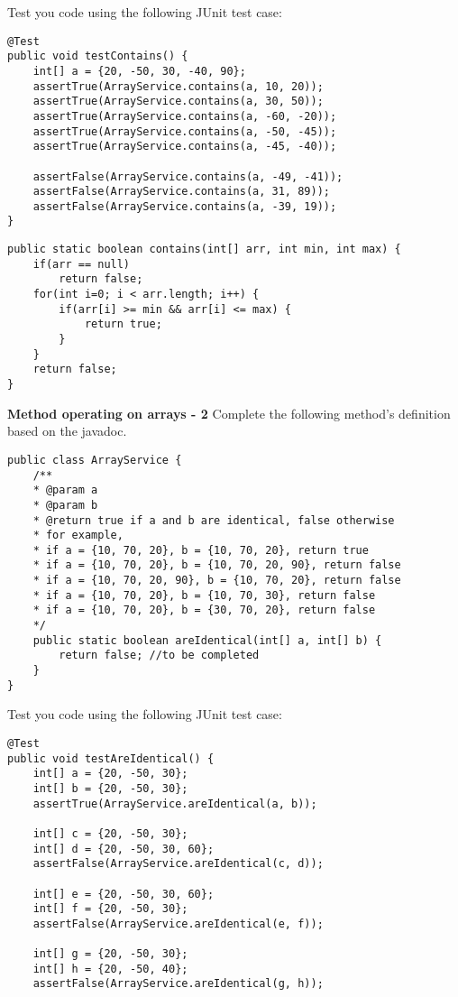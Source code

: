 \begin{questions}
Test you code using the following JUnit test case:

\begin{lstlisting}[style=junit]
@Test
public void testContains() {
	int[] a = {20, -50, 30, -40, 90};
	assertTrue(ArrayService.contains(a, 10, 20));
	assertTrue(ArrayService.contains(a, 30, 50));
	assertTrue(ArrayService.contains(a, -60, -20));
	assertTrue(ArrayService.contains(a, -50, -45));
	assertTrue(ArrayService.contains(a, -45, -40));
	
	assertFalse(ArrayService.contains(a, -49, -41));
	assertFalse(ArrayService.contains(a, 31, 89));
	assertFalse(ArrayService.contains(a, -39, 19));
}
\end{lstlisting}
\ifprintanswers
\begin{lstlisting}
public static boolean contains(int[] arr, int min, int max) {
	if(arr == null)
		return false;
	for(int i=0; i < arr.length; i++) {
		if(arr[i] >= min && arr[i] <= max) {
			return true;
		}
	}
	return false;
}
\end{lstlisting}
\else
\newpage
\fi

\question \textbf{Method operating on arrays - 2}
Complete the following method's definition based on the javadoc.

\begin{lstlisting}[style=junit]
public class ArrayService {
	/**
	* @param a
	* @param b
	* @return true if a and b are identical, false otherwise
	* for example,
	* if a = {10, 70, 20}, b = {10, 70, 20}, return true
	* if a = {10, 70, 20}, b = {10, 70, 20, 90}, return false
	* if a = {10, 70, 20, 90}, b = {10, 70, 20}, return false
	* if a = {10, 70, 20}, b = {10, 70, 30}, return false
	* if a = {10, 70, 20}, b = {30, 70, 20}, return false
	*/
	public static boolean areIdentical(int[] a, int[] b) {
		return false; //to be completed
	}
}
\end{lstlisting}

Test you code using the following JUnit test case:

\begin{lstlisting}[style=junit]
@Test
public void testAreIdentical() {
	int[] a = {20, -50, 30};
	int[] b = {20, -50, 30};
	assertTrue(ArrayService.areIdentical(a, b));

	int[] c = {20, -50, 30};
	int[] d = {20, -50, 30, 60};
	assertFalse(ArrayService.areIdentical(c, d));

	int[] e = {20, -50, 30, 60};
	int[] f = {20, -50, 30};
	assertFalse(ArrayService.areIdentical(e, f));

	int[] g = {20, -50, 30};
	int[] h = {20, -50, 40};
	assertFalse(ArrayService.areIdentical(g, h));


\end{lstlisting}
\end{questions}
